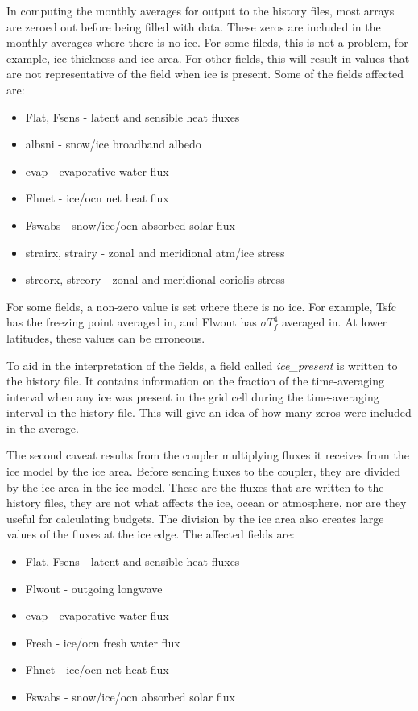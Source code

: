 In computing the monthly averages for output to the history files,
most arrays are zeroed out before being filled with data. These
zeros are included in the monthly averages where there is no ice.
For some fileds, this is not a problem, for example, ice thickness
and ice area.  For other fields, this will result in values that
are not representative of the field when ice is present.
Some of the fields affected are:

\begin{itemize}
\item Flat, Fsens - latent and sensible heat fluxes
\item albsni - snow/ice broadband albedo
\item evap - evaporative water flux
\item Fhnet - ice/ocn net heat flux
\item Fswabs - snow/ice/ocn absorbed solar flux
\item strairx, strairy - zonal and meridional atm/ice stress
\item strcorx, strcory - zonal and meridional coriolis stress
\end{itemize}

For some fields, a non-zero value is set where there is no ice.
For example, Tsfc has the freezing point averaged in, and Flwout
has $\sigma T_f^4$ averaged in.  At lower latitudes, these values
can be erroneous. 

To aid in the interpretation of the fields, a field called 
{\it ice\_present} is written to the history file.  It contains
information on the fraction of the time-averaging interval when any
ice was present in the grid cell during the time-averaging interval
in the history file.  This will give an idea of how many
zeros were included in the average.

The second caveat results from the coupler multiplying fluxes it receives
from the ice model by the ice area.  Before sending fluxes to the coupler,
they are divided by the ice area in the ice model.  These are the fluxes
that are written to the history files, they are not what affects the ice,
ocean or atmosphere, nor are they useful for calculating budgets.  The
division by the ice area also creates large values of the fluxes at the
ice edge. The affected fields are:

\begin{itemize}
\item Flat, Fsens - latent and sensible heat fluxes
\item Flwout - outgoing longwave
\item evap - evaporative water flux
\item Fresh - ice/ocn fresh water flux
\item Fhnet - ice/ocn net heat flux
\item Fswabs - snow/ice/ocn absorbed solar flux
\end{itemize}

